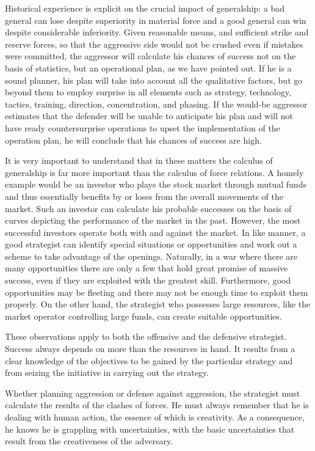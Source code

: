 Historical experience is explicit on the crucial impact of generalship: a bad general can lose despite superiority in material force and a good general can win despite considerable inferiority. Given reasonable means, and sufficient strike and reserve forces, so that the aggressive side would not be crushed even if mistakes were committed, the aggressor will calculate his chances of success not on the basis of statistics, but an operational plan, as we have pointed out. If he is a sound planner, his plan will take into account all the qualitative factors, but go beyond them to employ surprise in all elements such as strategy, technology, tactics, training, direction, concentration, and phasing. If the would-be aggressor estimates that the defender will be unable to anticipate his plan and will not have ready countersurprise operations to upset the implementation of the operation plan, he will conclude that his chances of success are high.

It is very important to understand that in these matters the calculus of generalship is far more important than the calculus of force relations. A homely example would be an investor who plays the stock market through mutual funds and thus essentially benefits by or loses from the overall movements of the market. Such an investor can calculate his probable successes on the basis of curves depicting the performance of the market in the past. However, the most successful investors operate both with and against the market. In like manner, a good strategist can identify special situations or opportunities and work out a scheme to take advantage of the openings. Naturally, in a war where there are many opportunities there are only a few that hold great promise of massive success, even if they are exploited with the greatest skill. Furthermore, good opportunities may be fleeting and there may not be enough time to exploit them properly. On the other hand, the strategist who possesses large resources, like the market operator controlling large funds, can create suitable opportunities.

These observations apply to both the offensive and the defensive strategist. Success always depends on more than the resources in hand. It results from a clear knowledge of the objectives to be gained by the particular strategy and from seizing the initiative in carrying out the strategy.

Whether planning aggression or defense against aggression, the strategist must calculate the results of the clashes of forces. He must always remember that he is dealing with human action, the essence of which is creativity. As a consequence, he knows he is grappling with uncertainties, with the basic uncertainties that result from the creativeness of the adversary.

